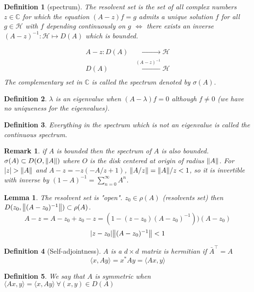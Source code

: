 \documentclass{article}
\newtheorem*{definition}{Definition}
\newtheorem*{lemma}{Lemma}
\newtheorem*{remark}{Remark}
\newcommand{\CC}{\mathbb{C}}
\newcommand{\cH}{\mathcal{H}}
\newcommand{\sig}{\sigma}
\newcommand{\la}{\lambda}
\renewcommand{\sp}[2]{\langle #1,#2 \rangle}
\newcommand{\T}[1]{#1^{\intercal}}
\begin{document}
\begin{definition}[spectrum] 
  The resolvent set is the set of all complex numbers $z \in \CC$ for which the equation $(A - z) f = g$ 
  admits a unique solution $f$ for all $g \in \cH$ with $f$ depending continuously on $g$ 
  $\Leftrightarrow$ there exists an inverse $(A - z)^{-1} \colon \cH \mapsto D(A)$ which is bounded.
  \begin{align*}
  	A - z \colon D(A) & \xrightarrow{\phantom{(A-z)^{-1}}} \cH \\
                 D(A) & \xleftarrow{(A-z)^{-1}} \cH \\
  \end{align*}
  The complementary set in $\CC$ is called the spectrum denoted by $\sig(A)$.
\end{definition} 

\begin{definition} 
  $\la$ is an eigenvalue when $(A-\la) f = 0$ although $f \neq 0$ (we have no uniqueness for the eigenvalues).
\end{definition} 

\begin{definition} 
  Everything in the spectrum which is not an eigenvalue is called the continuous spectrum.
\end{definition} 

\begin{remark} 
  if $A$ is bounded then the spectrum of $A$ is also bounded.
  $\sig(A) \subset D(O,\norm{A})$ where $O$ is the disk centered at origin of radius $\norm{A}$.
  For $ \abs{z} > \norm{A}$ and $A - z = - z (-A/z + 1)$, $\norm{A/z} = \norm{A}/z < 1$, so it is invertible with inverse by $(1 - A)^{-1} = \sum_{n=0}^\infty A^n$.
\end{remark} 

\begin{lemma} 
  The resolvent set is "open". 
  $z_0 \in \rho(A)$ (resolvents set) then $D(z_0,\norm{(A - z_0)^{-1}}) \subset \rho(A)$.
  $$ A - z = A - z_0 + z_0 - z = (1 - (z-z_0)(A-z_0)^{-1}))(A-z_0) $$
  $$ \abs{z - z_0} \norm{(A-z_0)^{-1}} < 1 $$
\end{lemma} 

\begin{definition}[Self-adjointness]
  $A$ is a $d \times d$ matrix is hermitian if $\T{\bar{A}} = A$
  $$ \sp{x}{A y} = x^* A y = \sp{A x}{y} $$
\end{definition} 

\begin{definition}
  We say that $A$ is symmetric when $\sp{Ax}{y} = \sp{x}{Ay} \ \forall (x,y) \in D(A)$
\end{definition} 
\end{document}
